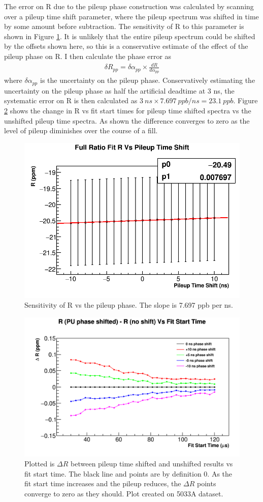 		The error on R due to the pileup phase construction was calculated by scanning over a pileup time shift parameter, where the pileup spectrum was shifted in time by some amount before subtraction. The sensitivity of R to this parameter is shown in Figure \ref{fig:PileupPhase}. It is unlikely that the entire pileup spectrum could be shifted by the offsets shown here, so this is a conservative estimate of the effect of the pileup phase on R. I then calculate the phase error as 
			\begin{align}
				\delta R_{pp} = \delta\alpha_{pp} \times \frac{dR}{d\alpha_{pp}}
			\end{align}
		where $\delta\alpha_{pp}$ is the uncertainty on the pileup phase. Conservatively estimating the uncertainty on the pileup phase as half the artificial deadtime at 3 ns, the systematic error on R is then calculated as $\SI{3}{ns} \times \SI{7.697}{ppb/ns} = \SI{23.1}{ppb}$. Figure \ref{fig:PileupTimeShiftFS} shows the change in R vs fit start times for pileup time shifted spectra vs the unshifted pileup time spectra. As shown the difference converges to zero as the level of pileup diminishes over the course of a fill.

		\begin{figure}[]
			\centering
			\includegraphics[width=.5\textwidth]{RatioCBO_R_Vs_PileupTimeShift_Canv}
		    \caption[PileupPhase]{Sensitivity of R vs the pileup phase. The slope is 7.697 ppb per ns.}
		    \label{fig:PileupPhase}
		\end{figure}

		\begin{figure}[]
			\centering
			\includegraphics[width=.8\textwidth]{pileupTimeShiftComparison}
		    \caption[PileupTimeShiftFS]{Plotted is $\Delta R$ between pileup time shifted and unshifted results vs fit start time. The black line and points are by definition 0. As the fit start time increases and the pileup reduces, the $\Delta R$ points converge to zero as they should. Plot created on 5033A dataset.}
		    \label{fig:PileupTimeShiftFS}
		\end{figure}

